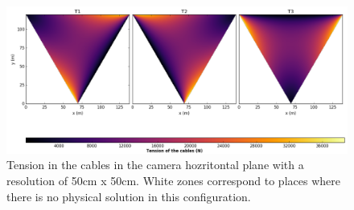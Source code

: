 \documentclass[10 pt]{article}
\begin{document}
\begin{figure}[H]
\includegraphics[width = \linewidth]{Tension_cables}
\caption{Tension in the cables in the camera hozritontal plane with a resolution of 50cm x 50cm. White zones correspond to places where there is no physical solution in this configuration.}
\end{figure}
\end{document}

